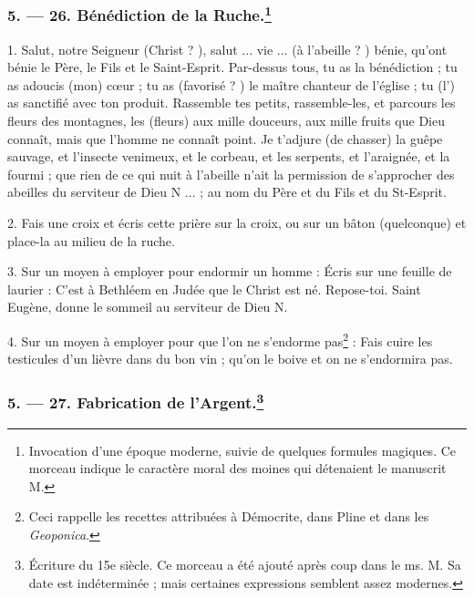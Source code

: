 \documentclass[a4paper, 11pt, oneside, polutonikogreek, french]{article}
\begin{document}
\bigskip
\centerline{\EightStarTaper}
\centerline{\EightStarTaper\EightStarTaper}
\bigskip

\subsubsection[5. --- 26. Bénédiction de la Ruche.]{5. --- 26. Bénédiction de la Ruche.\footnote{Invocation d'une époque moderne, suivie de quelques formules magiques. Ce morceau indique le caractère moral des moines qui détenaient le manuscrit M.}}

1. Salut, notre Seigneur (Christ ? ), salut ... vie ... (à l'abeille ? ) bénie, qu'ont bénie le Père, le Fils et le Saint-Esprit. Par-dessus tous, tu as la bénédiction ; tu as adoucis (mon) cœur ; tu as (favorisé ? ) le maître chanteur de l'église ; tu (l') as sanctifié avec ton produit. Rassemble tes petits, rassemble-les, et parcours les fleurs des montagnes, les (fleurs) aux mille douceurs, aux mille fruits que Dieu connaît, mais que l'homme ne connaît point. Je t'adjure (de chasser) la guêpe sauvage, et l'insecte venimeux, et le corbeau, et les serpents, et l'araignée, et la fourmi ; que rien de ce qui nuit à l'abeille n'ait la permission de s'approcher des abeilles du serviteur de Dieu N ... ; au nom du Père et du Fils et du St-Esprit.

2. Fais une croix et écris cette prière sur la croix, ou sur un bâton (quelconque) et place-la au milieu de la ruche.

3. Sur un moyen à employer pour endormir un homme : Écris sur une feuille de laurier : C'est à Bethléem en Judée que le Christ est né. Repose-toi. Saint Eugène, donne le sommeil au serviteur de Dieu N.

4. Sur un moyen à employer pour que l'on ne s'endorme pas\footnote{Ceci rappelle les recettes attribuées à Démocrite, dans Pline et dans les \emph{Geoponica}.} : Fais cuire les testicules d'un lièvre dans du bon vin ; qu'on le boive et on ne s'endormira pas.

\bigskip
\centerline{\EightStarTaper}
\centerline{\EightStarTaper\EightStarTaper}
\bigskip

\subsubsection[5. --- 27. Fabrication de l'Argent.]{5. --- 27. Fabrication de l'Argent.\footnote{Écriture du 15e siècle. Ce morceau a été ajouté après coup dans le ms. M. Sa date est indéterminée ; mais certaines expressions semblent assez modernes.}}
\end{document}
